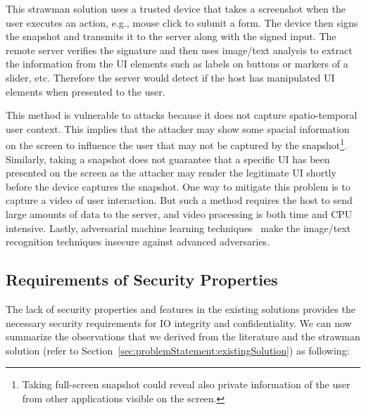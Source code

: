 


 This strawman solution uses a trusted device that takes a screenshot when the user executes an action, e.g., mouse click to submit a form. The device then signs the snapshot and transmits it to the server along with the signed input. The remote server verifies the signature and then uses image/text analysis to extract the information from the UI elements such as labels on buttons or markers of a slider, etc. Therefore the server would detect if the host has manipulated UI elements when presented to the user.

This method is vulnerable to attacks because it does not capture spatio-temporal user context. This implies that the attacker may show some spacial information on the screen to influence the user that may not be captured by the snapshot\footnote{Taking full-screen snapshot could reveal also private information of the user from other applications visible on the screen.}. Similarly, taking a snapshot does not guarantee that a specific UI has been presented on the screen as the attacker may render the legitimate UI shortly before the device captures the snapshot.
One way to mitigate this problem is to capture a video of user interaction. But such a method requires the host to send large amounts of data to the server, and video processing is both time and CPU intensive. 
Lastly, adversarial machine learning techniques~\cite{eykholt2017robust,sitawarin2018rogue} make the image/text recognition techniques insecure against advanced adversaries.


\subsection{Requirements of Security Properties}
\label{sec:problemStatement:goals}

The lack of security properties and features in the existing solutions provides the necessary security requirements for IO integrity and confidentiality. We can now summarize the observations that we derived from the literature and the strawman solution (refer to Section~\ref{sec:problemStatement:existingSolution}) as following:

